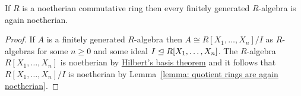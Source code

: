 \begin{corollary}
  \label{corollary: finite type preserves noetherian}
  If $R$ is a noetherian commutative ring then every finitely generated $R$-algebra is again noetherian.
\end{corollary}


\begin{proof}
  If $A$ is a finitely generated $R$-algebra then $A \cong R[X_1, \dotsc, X_n]/I$ as $R$-algebras for some $n \geq 0$ and some ideal $I \trianglelefteq R[X_1, \dotsc, X_n]$.
  The $R$-algebra $R[X_1, \dotsc, X_n]$ is noetherian by \hyperref[theorem: Hilberts basis theorem]{Hilbert's basis theorem} and it follows that $R[X_1, \dotsc, X_n]/I$ is noetherian by Lemma~\ref{lemma: quotient rings are again noetherian}.
\end{proof}




